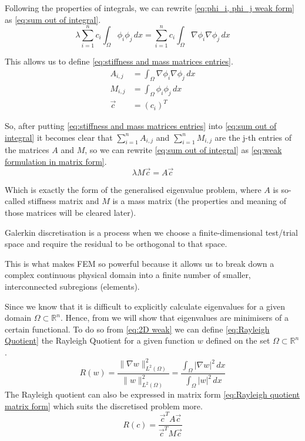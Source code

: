 \documentclass[conference]{IEEEtran}
\begin{document}
Following the properties of integrals, we can rewrite \ref{eq:phi_i, phi_j weak form} as \ref{eq:sum out of integral}.
\begin{equation}
    \lambda \sum^n_{i=1}c_i \int_\Omega \phi_i\phi_j \, dx = \sum^n_{i=1}c_i \int_\Omega \nabla{\phi_i}\nabla{\phi_j} \, dx
    \label{eq:sum out of integral}
\end{equation}

This allows us to define \ref{eq:stiffness and mass matrices entries}.
\begin{equation}
\begin{aligned}
    A_{i,j} &= \int_\Omega \nabla{\phi_i}\nabla{\phi_j} \, dx \\
    M_{i,j} &= \int_\Omega \phi_i\phi_j \, dx \\
    \vec{c} &= (c_i)^T
    \label{eq:stiffness and mass matrices entries}
\end{aligned}
\end{equation}

So, after putting \ref{eq:stiffness and mass matrices entries} into \ref{eq:sum out of integral} it becomes clear that $\sum^n_{i=1}A_{i,j}$ and $\sum^n_{i=1}M_{i,j}$ are the j-th entries of the matrices $A$ and $M$, so we can rewrite \ref{eq:sum out of integral} as \ref{eq:weak formulation in matrix form}.
\begin{equation}
    \lambda M\vec{c} = A\vec{c} 
    \label{eq:weak formulation in matrix form}
\end{equation}

Which is exactly the form of the generalised eigenvalue problem, where $A$ is so-called stiffness matrix and $M$ is a mass matrix (the properties and meaning of those matrices will be cleared later). 

Galerkin discretisation is a process when we choose a finite-dimensional test/trial space and require the residual to be orthogonal to that space.

This is what makes FEM so powerful because it allows us to break down a complex continuous physical domain into a finite number of smaller, interconnected subregions (elements).

Since we know that it is difficult to explicitly calculate eigenvalues for a given domain $\Omega \subset \mathbb{R}^n$. Hence, from \cite{b9.1} we will show that eigenvalues are minimisers of a certain functional.
To do so from \ref{eq:2D weak} we can define \ref{eq:Rayleigh Quotient} the Rayleigh Quotient for a given function $w$ defined on the set $\Omega \subset \mathbb{R}^n$.
\begin{equation}
    R(w) = \frac{\|\nabla w\|_{L^2(\Omega)}^2}{\|w\|_{L^2(\Omega)}^2} = \frac{\int_\Omega |\nabla w|^2 \, dx}{\int_\Omega |w|^2 \, dx}
    \label{eq:Rayleigh Quotient}
\end{equation}
The Rayleigh quotient can also be expressed in matrix form \ref{eq:Rayleigh quotient matrix form} which suits the discretised problem more.
\begin{equation}
    R(c) = \frac{\vec{c}^TA\vec{c}}{\vec{c}^TM\vec{c}}
    \label{eq:Rayleigh quotient matrix form}
\end{equation}
\end{document}
